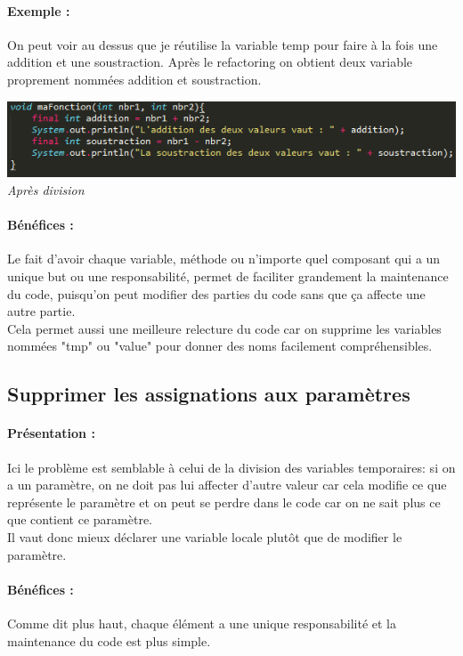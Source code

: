 \documentclass[a4paper,twoside,12pt,openright]{report}
\begin{document}
\paragraph{Exemple :}
On peut voir au dessus que je réutilise la variable temp pour faire à la fois une addition et une soustraction. Après le refactoring on obtient deux variable proprement nommées addition et soustraction.

\begin{center}
\includegraphics[scale=1]{Image/Diviser_Temp2.png}\\
\itshape{Après division}
\end{center}

\paragraph{Bénéfices :}
Le fait d'avoir chaque variable, méthode ou n'importe quel composant qui a un unique but ou une responsabilité, permet de faciliter grandement la maintenance du code, puisqu'on peut modifier des parties du code sans que ça affecte une autre partie.\\
Cela permet aussi une meilleure relecture du code car on supprime les variables nommées "tmp" ou "value" pour donner des noms facilement compréhensibles.\\

\subsection{Supprimer les assignations aux paramètres}
\paragraph{Présentation :}
Ici le problème est semblable à celui de la division des variables temporaires: si on a un paramètre, on ne doit pas lui affecter d'autre valeur car cela modifie ce que représente le paramètre et on peut se perdre dans le code car on ne sait plus ce que contient ce paramètre.\\
Il vaut donc mieux déclarer une variable locale plutôt que de modifier le paramètre.

\paragraph{Bénéfices :}
Comme dit plus haut, chaque élément a une unique responsabilité et la maintenance du code est plus simple.\\
\end{document}
